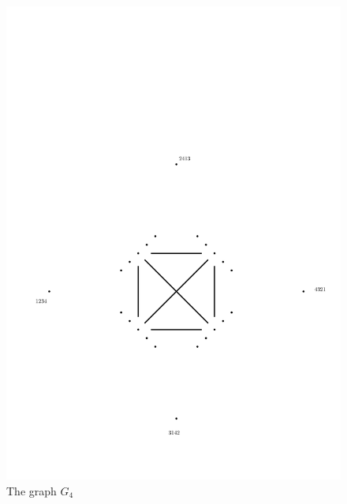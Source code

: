 \documentclass[runningheads]{llncs}
\begin{document}
\begin{figure}[ht]
  \centering
  \includegraphics[scale=0.5]{G4b.pdf}
  \caption{The graph $G_{4}$}
  \label{G4}
\end{figure}
\end{document}

